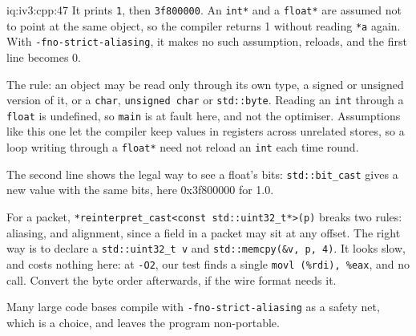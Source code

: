 \begin{solution}{iq:iv3:cpp:47}
It prints \texttt{1}, then \texttt{3f800000}. An \texttt{int*} and a \texttt{float*} are assumed not to point at the same object, so the compiler returns 1 without reading \texttt{*a} again. With \texttt{-fno-strict-aliasing}, it makes no such assumption, reloads, and the first line becomes 0.

The rule: an object may be read only through its own type, a signed or unsigned version of it, or a \texttt{char}, \texttt{unsigned char} or \texttt{std::byte}. Reading an \texttt{int} through a \texttt{float} is undefined, so \texttt{main} is at fault here, and not the optimiser. Assumptions like this one let the compiler keep values in registers across unrelated stores, so a loop writing through a \texttt{float*} need not reload an \texttt{int} each time round.

The second line shows the legal way to see a float's bits: \texttt{std::bit\_cast} gives a new value with the same bits, here 0x3f800000 for 1.0.

For a packet, \texttt{*reinterpret\_cast<const std::uint32\_t*>(p)} breaks two rules: aliasing, and alignment, since a field in a packet may sit at any offset. The right way is to declare a \texttt{std::uint32\_t v} and \texttt{std::memcpy(\&v, p, 4)}. It looks slow, and costs nothing here: at \texttt{-O2}, our test finds a single \texttt{movl (\%rdi), \%eax}, and no call. Convert the byte order afterwards, if the wire format needs it.

Many large code bases compile with \texttt{-fno-strict-aliasing} as a safety net, which is a choice, and leaves the program non-portable.

\end{solution}

